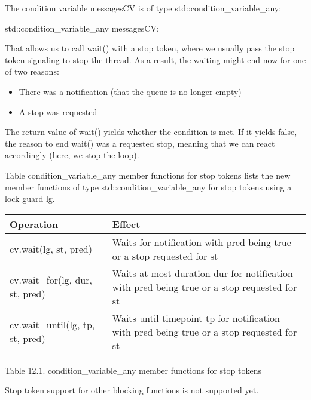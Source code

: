 The condition variable messagesCV is of type std::condition\_variable\_any:

\begin{cpp}
std::condition_variable_any messagesCV;
\end{cpp}

That allows us to call wait() with a stop token, where we usually pass the stop token signaling to stop the thread. As a result, the waiting might end now for one of two reasons:

\begin{itemize}
\item 
There was a notification (that the queue is no longer empty)

\item 
A stop was requested
\end{itemize}

The return value of wait() yields whether the condition is met. If it yields false, the reason to end wait() was a requested stop, meaning that we can react accordingly (here, we stop the loop).

Table condition\_variable\_any member functions for stop tokens lists the new member functions of type std::condition\_variable\_any for stop tokens using a lock guard lg.

\begin{longtable}[c]{|l|l|}
\hline
\textbf{Operation} & \textbf{Effect} \\ \hline
\endfirsthead
%
\endhead
%
cv.wait(lg, st, pred)            & Waits for notification with pred being true or a stop requested for st                      \\ \hline
cv.wait\_for(lg, dur, st, pred)  & Waits at most duration dur for notification with pred being true or a stop requested for st \\ \hline
cv.wait\_until(lg, tp, st, pred) & Waits until timepoint tp for notification with pred being true or a stop requested for st   \\ \hline
\end{longtable}

\begin{center}
Table 12.1. condition\_variable\_any member functions for stop tokens
\end{center}

Stop token support for other blocking functions is not supported yet.







